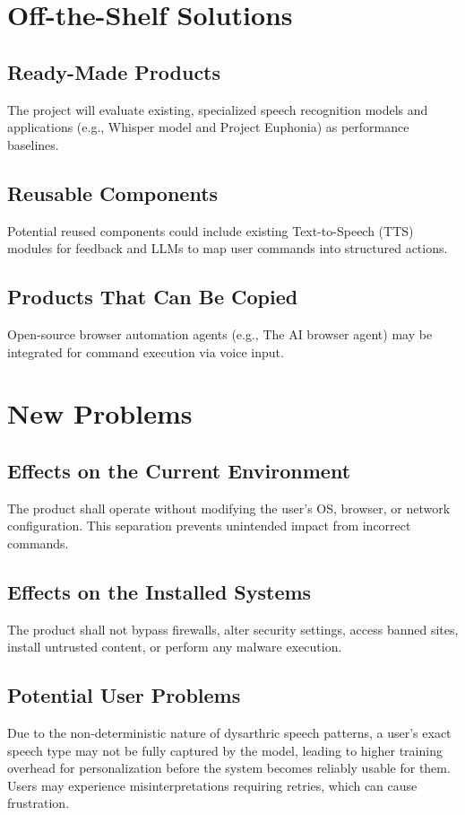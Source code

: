\documentclass[11pt]{article}
\begin{document}
\section{Off-the-Shelf Solutions}
\subsection{Ready-Made Products}
The project will evaluate existing, specialized speech recognition models and applications (e.g., Whisper model and Project Euphonia) as performance baselines.

\subsection{Reusable Components}
Potential reused components could include existing Text-to-Speech (TTS) modules for feedback and LLMs to map user commands into structured actions.

\subsection{Products That Can Be Copied}
Open-source browser automation agents (e.g., The AI browser agent) may be integrated for command execution via voice input.


\section{New Problems}
\subsection{Effects on the Current Environment}
The product shall operate without modifying the user’s OS, browser, or network configuration. This separation prevents unintended impact from incorrect commands.

\subsection{Effects on the Installed Systems}
The product shall not bypass firewalls, alter security settings, access banned sites, install untrusted content, or perform any malware execution.

\subsection{Potential User Problems}
Due to the non-deterministic nature of dysarthric speech patterns, a user’s exact speech type may not be fully captured by the model, leading to higher training overhead for personalization before the system becomes reliably usable for them. Users may experience misinterpretations requiring retries, which can cause frustration.
\end{document}
